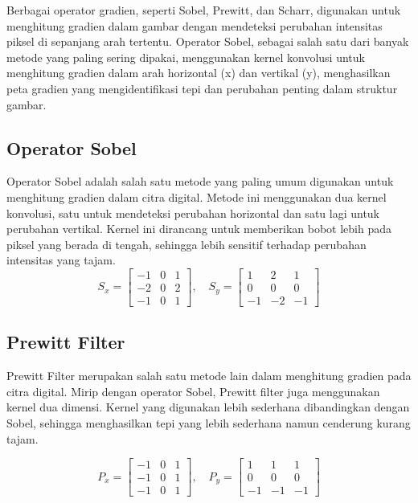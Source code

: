   Berbagai operator gradien, seperti Sobel, Prewitt, dan Scharr, digunakan untuk menghitung gradien dalam gambar dengan mendeteksi perubahan intensitas piksel di sepanjang arah tertentu. 
Operator Sobel, sebagai salah satu dari banyak metode yang paling sering dipakai, menggunakan kernel konvolusi untuk menghitung gradien dalam arah horizontal (x) dan vertikal (y), menghasilkan peta gradien yang mengidentifikasi tepi dan perubahan penting dalam struktur gambar.
\subsection{Operator Sobel}
  Operator Sobel adalah salah satu metode yang paling umum digunakan untuk menghitung gradien dalam citra digital. Metode ini menggunakan dua kernel konvolusi, satu untuk mendeteksi perubahan horizontal dan satu lagi untuk perubahan vertikal. Kernel ini dirancang untuk memberikan bobot lebih pada piksel yang berada di tengah, sehingga lebih sensitif terhadap perubahan intensitas yang tajam.
  \begin{equation}
      S_x = \begin{bmatrix}
        -1 & 0 & 1 \\
        -2 & 0 & 2 \\
        -1 & 0 & 1
  \end{bmatrix}, \quad
      S_y = \begin{bmatrix}
        1 & 2 & 1 \\
        0 & 0 & 0 \\
        -1 & -2 & -1
  \end{bmatrix}
      \label{eq:sobel-kernel}
\end{equation}

  \subsection{Prewitt Filter}
    Prewitt Filter merupakan salah satu metode lain dalam menghitung gradien pada citra digital.
  Mirip dengan operator Sobel, Prewitt filter juga menggunakan kernel dua dimensi. Kernel yang digunakan lebih sederhana dibandingkan dengan Sobel, sehingga menghasilkan tepi yang lebih sederhana namun cenderung kurang tajam.

\begin{equation*}
  P_x = \begin{bmatrix}
    -1 & 0 & 1 \\
    -1 & 0 & 1 \\
    -1 & 0 & 1
  \end{bmatrix}, \quad
  P_y = \begin{bmatrix}
    1 & 1 & 1 \\
    0 & 0 & 0 \\
    -1 & -1 & -1
  \end{bmatrix}
\end{equation*}

